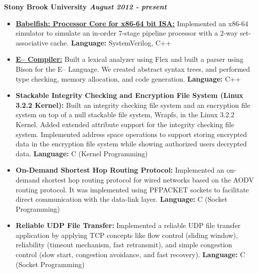 \documentclass[11pt]{article}
\newenvironment{changemargin}[2]{%
  \begin{list}{}{%
    \setlength{\topsep}{0pt}%
    \setlength{\leftmargin}{#1}%
    \setlength{\rightmargin}{#2}%
    \setlength{\listparindent}{\parindent}%
    \setlength{\itemindent}{\parindent}%
    \setlength{\parsep}{\parskip}%
  }%
  \item[]}{\end{list}
}
\newenvironment{body} {
	\vspace*{-16pt}
	\begin{changemargin}{-0.25in}{-0.5in}
  }	
	{\end{changemargin}
}
\begin{document}
\begin{body}
	\vspace{14pt}
	\textbf{Stony Brook University \hfill \emph{August 2012 - present}}\\
	\vspace*{-4pt}
	\begin{itemize} \itemsep -0pt
		\item \href{https://bitbucket.org/sonamdp42/babelfish}{\textbf{Babelfish: Processor Core for x86-64 bit ISA:}} Implemented an x86-64 simulator to simulate an in-order 7-stage pipeline processor with a 2-way set-associative cache. \textbf{Language:} SystemVerilog, C++\\
		\item \href{https://github.com/arunov/dory}{\textbf{E-- Compiler:}} Built a lexical analyzer using Flex and built a parser using Bison for the E-- Language. We created abstract syntax trees, and performed type checking, memory allocation, and code generation. \textbf{Language:} C++\\
		\item \textbf{Stackable Integrity Checking and Encryption File System (Linux 3.2.2 Kernel):} Built an integrity checking file system and an encryption file system on top of a null stackable file system, Wrapfs, in the Linux 3.2.2 Kernel. Added extended attribute support for the integrity checking file system. Implemented address space operations to support storing encrypted data in the encryption file system while showing authorized users decrypted data. \textbf{Language:} C (Kernel Programming)\\
		\item \textbf{On-Demand Shortest Hop Routing Protocol:} Implemented an on-demand shortest hop routing protocol for wired networks based on the AODV routing protocol. It was implemented using PF\textunderscore PACKET sockets to facilitate direct communication with the data-link layer. \textbf{Language:} C (Socket Programming)\\
		\item \textbf{Reliable UDP File Transfer:} Implemented a reliable UDP file transfer application by applying TCP concepts like flow control (sliding window), reliability (timeout mechanism, fast retransmit), and simple congestion control (slow start, congestion avoidance, and fast recovery). \textbf{Language:} C (Socket Programming)\\

\end{itemize}
\end{body}
\end{document}
